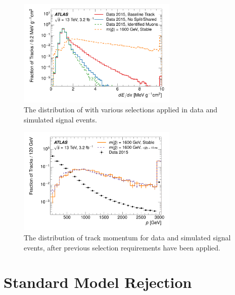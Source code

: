 \begin{figure}[h]
\centering
\includegraphics[width=0.68\textwidth]{figures/dedx_isolation.pdf}
\caption{The distribution of \dedx with various selections applied in data and simulated signal events.}
\label{fig:dedx_nsplit}
\end{figure}

\begin{figure}[h]
\centering
\includegraphics[width=0.68\textwidth]{figures/selection_p_nm1.pdf}
\caption{The distribution of track momentum for data and simulated signal events, after previous selection requirements have been applied.}
\label{fig:nm1_p}
\end{figure}


\section{Standard Model Rejection}
\label{sec:sm_rejection}



